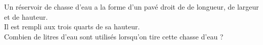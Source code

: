 \begin{exercice}
   Un réservoir de chasse d'eau a la forme d'un pavé droit de  de longueur,  de largeur et  de hauteur. \\
   Il est rempli aux trois quarts de sa hauteur. \\
   Combien de litres d'eau sont utilisés lorsqu'on tire cette chasse d'eau ?
\end{exercice}
